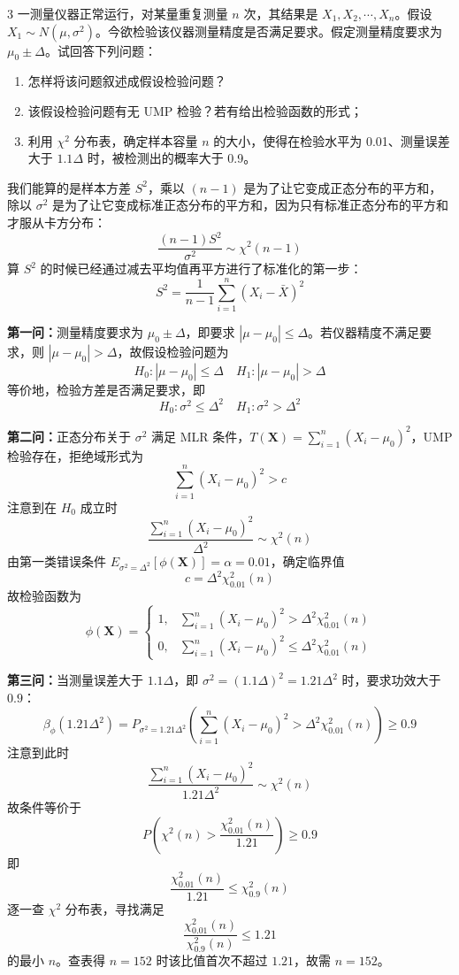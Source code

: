 \begin{homework}{3}
一测量仪器正常运行，对某量重复测量 $n$ 次，其结果是 $X_1, X_2, \cdots, X_n$。假设 $X_1 \sim N(\mu, \sigma^2)$。今欲检验该仪器测量精度是否满足要求。假定测量精度要求为 $\mu_0 \pm \Delta$。试回答下列问题：
\begin{enumerate}
    \item 怎样将该问题叙述成假设检验问题？
    \item 该假设检验问题有无 UMP 检验？若有给出检验函数的形式；
    \item 利用 $\chi^2$ 分布表，确定样本容量 $n$ 的大小，使得在检验水平为 0.01、测量误差大于 $1.1\Delta$ 时，被检测出的概率大于 0.9。
\end{enumerate}
\end{homework}
\begin{dxtips}
    我们能算的是样本方差 $S^2$，乘以 $(n-1)$ 是为了让它变成正态分布的平方和，除以 $\sigma^2$ 是为了让它变成标准正态分布的平方和，因为只有标准正态分布的平方和才服从卡方分布：
$$\frac{(n-1)S^2}{\sigma^2} \sim \chi^2(n-1)$$算 $S^2$ 的时候已经通过减去平均值再平方进行了标准化的第一步：
$$S^2 = \frac{1}{n-1}\sum_{i=1}^n (X_i - \bar{X})^2$$
\end{dxtips}
\begin{solution}
\textbf{第一问：}测量精度要求为 $\mu_0 \pm \Delta$，即要求 $|\mu - \mu_0| \leq \Delta$。若仪器精度不满足要求，则 $|\mu - \mu_0| > \Delta$，故假设检验问题为
$$H_0: |\mu - \mu_0| \leq \Delta \quad H_1: |\mu - \mu_0| > \Delta$$
等价地，检验方差是否满足要求，即
$$H_0: \sigma^2 \leq \Delta^2 \quad H_1: \sigma^2 > \Delta^2$$

\textbf{第二问：}正态分布关于 $\sigma^2$ 满足 MLR 条件，$T(\boldsymbol{X}) = \sum_{i=1}^n (X_i - \mu_0)^2$，UMP 检验存在，拒绝域形式为
$$\sum_{i=1}^n (X_i - \mu_0)^2 > c$$
注意到在 $H_0$ 成立时
$$\frac{\sum_{i=1}^n (X_i-\mu_0)^2}{\Delta^2} \sim \chi^2(n)$$
由第一类错误条件 $E_{\sigma^2 = \Delta^2}[\phi(\boldsymbol{X})] = \alpha = 0.01$，确定临界值
$$c = \Delta^2 \chi^2_{0.01}(n)$$
故检验函数为
$$\phi(\boldsymbol{X}) = \begin{cases} 1, & \sum_{i=1}^n (X_i-\mu_0)^2 > \Delta^2 \chi^2_{0.01}(n) \\ 0, & \sum_{i=1}^n (X_i-\mu_0)^2 \leq \Delta^2 \chi^2_{0.01}(n) \end{cases}$$

\textbf{第三问：}当测量误差大于 $1.1\Delta$，即 $\sigma^2 = (1.1\Delta)^2 = 1.21\Delta^2$ 时，要求功效大于 $0.9$：
$$\beta_\phi(1.21\Delta^2) = P_{\sigma^2 = 1.21\Delta^2}\left(\sum_{i=1}^n(X_i-\mu_0)^2 > \Delta^2\chi^2_{0.01}(n)\right) \geq 0.9$$
注意到此时
$$\frac{\sum_{i=1}^n(X_i-\mu_0)^2}{1.21\Delta^2} \sim \chi^2(n)$$
故条件等价于
$$P\left(\chi^2(n) > \frac{\chi^2_{0.01}(n)}{1.21}\right) \geq 0.9$$
即
$$\frac{\chi^2_{0.01}(n)}{1.21} \leq \chi^2_{0.9}(n)$$
逐一查 $\chi^2$ 分布表，寻找满足
$$\frac{\chi^2_{0.01}(n)}{\chi^2_{0.9}(n)} \leq 1.21$$
的最小 $n$。查表得 $n = 152$ 时该比值首次不超过 $1.21$，故需 $n = 152$。
\end{solution}
